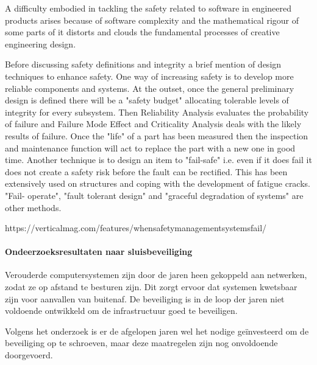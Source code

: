 A difficulty embodied in tackling the safety related to software in engineered products arises because of software complexity and the mathematical rigour of some parts of it distorts and clouds the fundamental processes of creative engineering design. 

Before discussing safety definitions and integrity a brief mention of design techniques to enhance safety. One way of increasing safety is to develop more reliable components and systems. At the outset, once the general preliminary design is defined there will be a "safety budget" allocating tolerable levels of integrity for every subsystem. Then Reliability Analysis evaluates the probability of failure and Failure Mode Effect and Criticality Analysis deals with the likely results of failure. Once the "life" of a part has been measured then the inspection and maintenance function will act to replace the part with a new one in good time. Another technique is to design an item to "fail-safe" i.e. even if it does fail it does not create a safety risk before the fault can be rectified. This has been extensively used on structures and coping with the development of fatigue cracks. "Fail- operate", "fault tolerant design" and "graceful degradation of systems" are other methods.


\cite{fulvio1993safetycriticalsystems}
\cite{dlrtabid}
\cite{knight2010SafetyCritical}
\cite{creavisafecritical}
\cite{valdes2018SafetybyAutomation}

https://verticalmag.com/features/whensafetymanagementsystemsfail/
\cite{2015whensafetymanagementsystemsfail}
\paragraph{Ondeerzoeksresultaten naar sluisbeveiliging}



Verouderde computersystemen zijn door de jaren heen gekoppeld aan netwerken, zodat ze op afstand te besturen zijn. Dit zorgt ervoor dat systemen kwetsbaar zijn voor aanvallen van buitenaf. De beveiliging is in de loop der jaren niet voldoende ontwikkeld om de infrastructuur goed te beveiligen.

Volgens het onderzoek is er de afgelopen jaren wel het nodige geïnvesteerd om de beveiliging op te schroeven, maar deze maatregelen zijn nog onvoldoende doorgevoerd.

